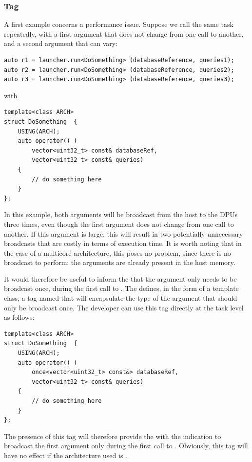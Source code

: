 \subsubsection{Tag }

A first example concerns a performance issue. Suppose we call the same task repeatedly, with a first argument that does not change from one call to another, and a second argument that can vary:

 \begin{verbatim}
auto r1 = launcher.run<DoSomething> (databaseReference, queries1);
auto r2 = launcher.run<DoSomething> (databaseReference, queries2);
auto r3 = launcher.run<DoSomething> (databaseReference, queries3);
\end{verbatim}
with
\begin{verbatim}
template<class ARCH>
struct DoSomething  {
    USING(ARCH);
    auto operator() (
        vector<uint32_t> const& databaseRef, 
        vector<uint32_t> const& queries)  
    {
        // do something here
    }
};
\end{verbatim}

In this example, both arguments will be broadcast from the host to the DPUs three times, even though the first argument does not change from one call to another. If this argument is large, this will result in two potentially unnecessary broadcasts that are costly in terms of execution time. It is worth noting that in the case of a multicore architecture, this poses no problem, since there is no broadcast to perform: the arguments are already present in the host memory.  

It would therefore be useful to inform the \BPL that the argument  only needs to be broadcast once, during the first call to . The \BPL defines, in the form of a template class, a tag named  that will encapsulate the type of the argument that should only be broadcast once. The developer can use this tag directly at the task level as follows:

 \begin{verbatim}
template<class ARCH>
struct DoSomething  {
    USING(ARCH);
    auto operator() (
        once<vector<uint32_t> const&> databaseRef, 
        vector<uint32_t> const& queries)  
    {
        // do something here
    }
};
\end{verbatim}

The presence of this  tag will therefore provide the \BPL with the indication to broadcast the first argument only  during the first call to . Obviously, this tag will have no effect if the architecture used is .

